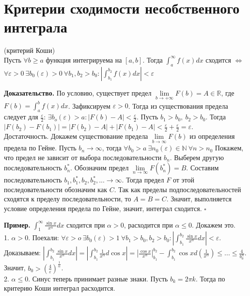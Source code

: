 \section{Критерии сходимости несобственного интеграла}
\begin{theor} (критерий Коши)\\
    Пусть $\forall b\geqslant a$ функция интегрируема на $[a,b]$. 
    Тогда $\int_a^\infty f(x)dx$ сходится $\Leftrightarrow$ $\forall 
    \varepsilon>0~\exists b_0(\varepsilon)>0~\forall b_1,b_2>b_0:
    \left| \int_{b_1}^{b_2}f(x)dx \right|<\varepsilon$
\end{theor}
\textbf{Доказательство.} По условию, существует предел 
$\lim\limits_{b \to +\infty} F(b)=A\in \mathbb{R}$, где
$F(b)=\int^b_af(x)dx$. 
Зафиксируем $\varepsilon>0$. Тогда из существования предела следует
для $\frac{\varepsilon}{2}$: $\exists b_o(\varepsilon)>a:\left| 
F(b)-A\right|<\frac{\varepsilon}{2}$. Пусть $b_1>b_0,~b_2>b_0$. Тогда
$|F(b_2)-F(b_1)|=|F(b_2)-A|+|F(b_1)-A|<\frac{\varepsilon}{2}+
\frac{\varepsilon}{2}=\varepsilon$.\\
Достаточность. Докажем существование предела  $\lim\limits_{b\to\infty}F(b)$
из определения предела по Гейне. Пусть $b_n\to \infty$, тогда $\forall b_0>a
~\exists n_0(\varepsilon)\in \mathbb{N}~\forall n>n_0$ 
Покажем, что предел не зависит от выбора последовательности $b_n$. 
Выберем другую последовательность  $b^*_n$. Обозначим предел 
$\lim\limits_{n \to \infty} F(b^*_n)=B$. Составим последовательность
$b_1,b^*_1,b_2,b^*_2,...\to \infty$. Тогда предел $F$ от этой
последовательности обозначим как  $C$. Так как пределы подпоследовательностей 
сходятся к пределу последовательности, то  $A=B=C$. Значит, выполняется
условие определения предела по Гейне, значит, интеграл сходится. $\square$

\textbf{Пример.} $\int_1^\infty \frac{\sin x}{x^\alpha}dx$ сходится при 
$\alpha>0$, расходится при $\alpha\leqslant 0$. Докажем это.\\
1. $\alpha>0$. Поехали: $\forall \varepsilon>o~\exists b_0(\varepsilon)>1~
\forall b_1>b_0,b_2>b_0: \left| \int^{b_2}_{b_1} \frac{\sin x}{x^\alpha}dx
\right|<\varepsilon$. Доказываем: 
$\left| \int^{b_2}_{b_1} \frac{\sin x}{x^\alpha}dx
\right|=\left| \int^{b_2}_{b_1} \frac{1}{x^\alpha}d\cos x\right|=
\left| \frac{\cos x}{x^\alpha} \right|^{b_2}_{b_1}-\int^{b_2}_{b_1} 
\cos x d(\frac{1}{x^\alpha})\leqslant ... \leqslant\frac{4}{b^\alpha_0}$.
Значит, $b_0>(\frac{4}{\varepsilon})^\frac{1}{\alpha}$.\\
2. $\alpha\leqslant 0$. Синус теперь принимает разные знаки. Пусть 
$b_k=2\pi k$. Тогда по критерию Коши интеграл расходится.


